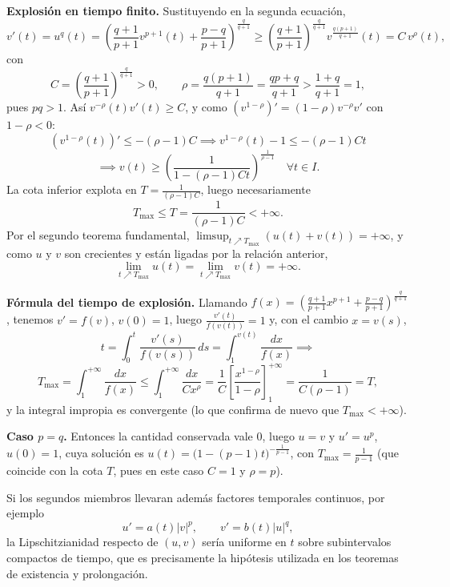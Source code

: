 {    \textbf{Explosión en tiempo finito.} Sustituyendo en la segunda ecuación,
    \[
        v'(t) = u^q(t) = \left( \frac{q+1}{p+1} v^{p+1}(t) + \frac{p-q}{p+1} \right)^{\frac{q}{q+1}} \geq \left( \frac{q+1}{p+1} \right)^{\frac{q}{q+1}} v^{\frac{q(p+1)}{q+1}}(t) = C \, v^{\rho}(t),
    \]
    con
    \[
        C = \left( \frac{q+1}{p+1} \right)^{\frac{q}{q+1}} > 0, \qquad \rho = \frac{q(p+1)}{q+1} = \frac{qp + q}{q+1} > \frac{1 + q}{q+1} = 1,
    \]
    pues $pq > 1$. Así $v^{-\rho}(t) v'(t) \geq C$, y como $\left( v^{1-\rho} \right)' = (1 - \rho) v^{-\rho} v'$ con $1 - \rho < 0$:
    \[
        \left( v^{1-\rho}(t) \right)' \leq -(\rho - 1) C \implies v^{1-\rho}(t) - 1 \leq -(\rho - 1) C t
    \]
    \[
        \implies v(t) \geq \left( \frac{1}{1 - (\rho - 1) C t} \right)^{\frac{1}{\rho - 1}} \quad \forall t \in I.
    \]
    La cota inferior explota en $T = \frac{1}{(\rho - 1) C}$, luego necesariamente
    \[
        T_{\max} \leq T = \frac{1}{(\rho - 1) C} < +\infty.
    \]
    Por el segundo teorema fundamental, $\limsup_{t \nearrow T_{\max}} (u(t) + v(t)) = +\infty$, y como $u$ y $v$ son crecientes y están ligadas por la relación anterior,
    \[
        \lim_{t \nearrow T_{\max}} u(t) = \lim_{t \nearrow T_{\max}} v(t) = +\infty.
    \]

    \textbf{Fórmula del tiempo de explosión.} Llamando $f(x) = \left( \frac{q+1}{p+1} x^{p+1} + \frac{p-q}{p+1} \right)^{\frac{q}{q+1}}$, tenemos $v' = f(v)$, $v(0) = 1$, luego $\frac{v'(t)}{f(v(t))} = 1$ y, con el cambio $x = v(s)$,
    \[
        t = \int_0^t \frac{v'(s)}{f(v(s))} \, ds = \int_1^{v(t)} \frac{dx}{f(x)} \implies
    \]
    \[
        T_{\max} = \int_1^{+\infty} \frac{dx}{f(x)} \leq \int_1^{+\infty} \frac{dx}{C x^{\rho}} = \frac{1}{C} \left[ \frac{x^{1-\rho}}{1-\rho} \right]_1^{+\infty} = \frac{1}{C(\rho - 1)} = T,
    \]
    y la integral impropia es convergente (lo que confirma de nuevo que $T_{\max} < +\infty$).

    \textbf{Caso $p = q$.} Entonces la cantidad conservada vale $0$, luego $u = v$ y $u' = u^p$, $u(0) = 1$, cuya solución es $u(t) = \bigl(1 - (p-1)t\bigr)^{-\frac{1}{p-1}}$, con $T_{\max} = \frac{1}{p-1}$ (que coincide con la cota $T$, pues en este caso $C = 1$ y $\rho = p$).

    \begin{observación}
        Si los segundos miembros llevaran además factores temporales continuos, por ejemplo
        \[
            u'=a(t)|v|^p,\qquad v'=b(t)|u|^q,
        \]
        la Lipschitzianidad respecto de $(u,v)$ sería uniforme en $t$ sobre subintervalos compactos de tiempo, que es precisamente la hipótesis utilizada en los teoremas de existencia y prolongación.
    \end{observación}
}

